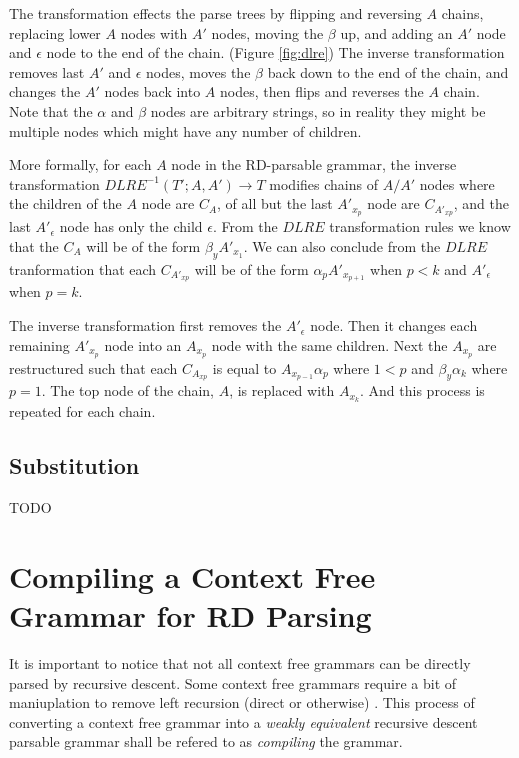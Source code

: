 \documentclass[11pt]{article}
\begin{document}
The transformation effects the parse trees by flipping and reversing $A$ chains,
replacing lower $A$ nodes with $A'$ nodes, moving the $\beta$ up,
and adding an $A'$ node and $\epsilon$ node to the end of the chain. (Figure \ref{fig:dlre}) The inverse transformation
removes last $A'$ and $\epsilon$ nodes, moves the $\beta$ back down to the end of the chain, and changes the $A'$ nodes back into
$A$ nodes, then flips and reverses the $A$ chain. Note that the $\alpha$ and $\beta$ nodes are arbitrary strings, so in reality
they might be multiple nodes which might have any number of children.

More formally, for each $A$ node in the RD-parsable grammar, the inverse transformation $DLRE^{-1}(T'; A, A') \rightarrow T$
modifies chains of $A/A'$ nodes where the children of the $A$ node are $C_A$, of all but the last $A'_{x_p}$ node are $C_{A'_{x p}}$,
and the last $A'_\epsilon$ node has only the child $\epsilon$.
From the $DLRE$ transformation rules we know that the $C_A$ will be of the form $\beta_y A'_{x_1}$. 
We can also conclude from the $DLRE$ tranformation that each $C_{A'_{x p}}$ will be of the form $\alpha_p A'_{x_{p+1}}$
when $p < k$ and $A'_\epsilon$ when $p=k$. 

The inverse transformation first removes the $A'_\epsilon$ node. Then it changes each remaining $A'_{x_p}$ node into an $A_{x_p}$ node
with the same children. Next the $A_{x_p}$ are restructured such that each $C_{A_{x p}}$
is equal to $A_{x_{p-1}} \alpha_p$ where $1 < p$ and $\beta_y \alpha_k$ where $p=1$. The top node of the chain, 
$A$, is replaced with $A_{x_k}$. And this process is repeated for each chain.

\subsection{Substitution}

TODO

\clearpage

\section{Compiling a Context Free Grammar for RD Parsing}

It is important to notice that not all context free grammars can be directly parsed by
recursive descent. Some context free grammars require a bit of maniuplation to remove
left recursion (direct or otherwise) \cite{compiler}. This process of converting a context
free grammar into a {\em weakly equivalent} recursive descent parsable grammar shall be refered to as
{\em compiling} the grammar.
\end{document}
